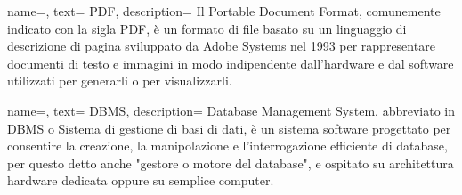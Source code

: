 {
    name=,
    text= PDF,
    description={ Il Portable Document Format, comunemente indicato con la sigla PDF, è un formato di file basato su un linguaggio di descrizione di pagina sviluppato da Adobe Systems nel 1993 per rappresentare documenti di testo e immagini in modo indipendente dall'hardware e dal software utilizzati per generarli o per visualizzarli.}
}


{
    name=,
    text= DBMS,
    description={ Database Management System, abbreviato in DBMS o Sistema di gestione di basi di dati, è un sistema software progettato per consentire la creazione, la manipolazione e l'interrogazione efficiente di database, per questo detto anche "gestore o motore del database", e ospitato su architettura hardware dedicata oppure su semplice computer.}
}




